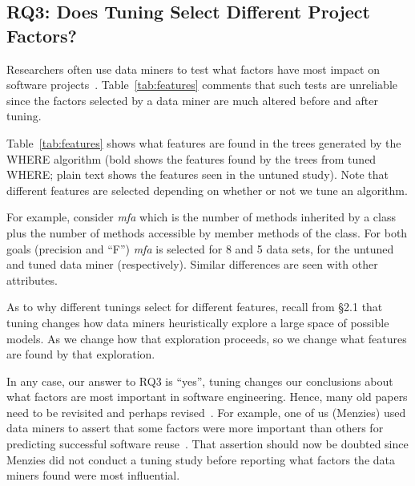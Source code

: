 \documentclass[smallextended]{svjour3}
\newcommand{\tab}[1]{Table~\ref{tab:#1}}
\begin{document}
 \subsection{RQ3: Does Tuning Select Different Project Factors? }\label{sect:import}


Researchers often use data miners to  test what factors have most impact on software projects~\cite{bell2013limited,rahman2013how,me02k,Moser:2008,zimmermann2007predicting,herzig2013predicting}. 
\tab{features} comments that such tests are unreliable since the factors selected by a data miner are much altered before and 
after tuning.

\tab{features} shows what features are found in the trees generated by the WHERE algorithm
(bold shows the features found by the trees from tuned WHERE; plain text shows the features seen
in the untuned study). Note that different features are selected depending on whether or not
we tune an algorithm.

For example, consider {\em mfa} which is the
number of methods inherited by a class plus the number of methods accessible by member methods of the class.
For both goals (precision and ``F'') {\em mfa} is selected for 8 and 5 data sets,
for the untuned and tuned data miner (respectively).
Similar differences are   seen with other attributes.

As to why different tunings select for different features,  recall from {\S}2.1 that tuning changes how data miners
heuristically explore a large space of possible models. As we change how that exploration proceeds,
so we change what features are found by that exploration.

In any case, our answer to RQ3 is ``yes'', tuning changes our
conclusions about what factors are most important in software engineering.
Hence, many old papers    need to be revisited  and perhaps revised~\cite{bell2013limited,rahman2013how,me02k,Moser:2008,zimmermann2007predicting,herzig2013predicting}.  
For example, one of us (Menzies) used data miners
to assert that some factors were more important than others for predicting
successful software reuse~\cite{me02k}. That assertion should now be doubted since Menzies did not conduct a tuning study before reporting what factors the data miners
found were most influential.
\end{document}
